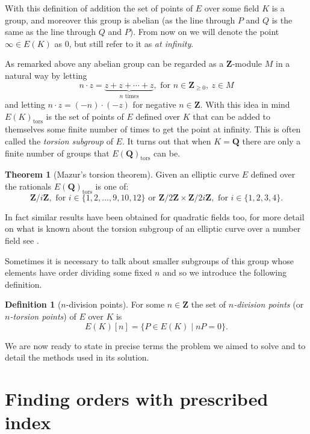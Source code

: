 \documentclass[12pt,a4paper,abstracton,bibtotoc]{scrreprt}
\theoremstyle{definition}
\newtheorem{thm}{Theorem}
\newtheorem{defn}{Definition}
\newcommand{\QQ}{\mathbf{Q}}
\newcommand{\ZZ}{\mathbf{Z}}
\begin{document}
With this definition of addition the set of points of $E$ over some field $K$ is a group, and moreover this group is abelian (as the line through $P$ and $Q$ is the same as the line through $Q$ and $P$).
From now on we will denote the point $\infty\in E(K)$ as $0$, but still refer to it as \emph{at infinity}.


As remarked above any abelian group can be regarded as a $\ZZ$-module $M$ in a natural way by letting 
\[n\cdot z = \underbrace{z + z + \cdots + z}_\text{$n$ times},\text{ for } n\in\ZZ_{\ge 0},\ z\in M\]
and letting $n\cdot z = (-n)\cdot(-z)$ for negative $n\in \ZZ$.
With this idea in mind $E(K)_\text{tors}$ is the set of points of $E$ defined over $K$ that can be added to themselves some finite number of times to get the point at infinity.
This is often called the \emph{torsion subgroup} of $E$.
It turns out that when $K = \QQ$ there are only a finite number of groups that $E(\QQ)_\text{tors}$ can be.

\begin{thm}[Mazur's torsion theorem]
\label{thm:tors}
Given an elliptic curve $E$ defined over the rationals $E(\QQ)_\text{tors}$ is one of:
\[
\ZZ/i\ZZ,\text{ for } i \in\{1,2,\ldots,9,10,12\}\text{ or }
\ZZ/2\ZZ \times \ZZ/2i\ZZ,\text{ for } i \in\{1,2,3,4\}.
\]
\end{thm}

In fact similar results have been obtained for quadratic fields too, for more detail on what is known about the torsion subgroup of an elliptic curve over a number field see \cite{sutherland}.

Sometimes it is necessary to talk about smaller subgroups of this group whose elements have order dividing some fixed $n$ and so we introduce the following definition.
\begin{defn}[$n$-division points]
For some $n\in\ZZ$ the set of \emph{$n$-division points} (or \emph{$n$-torsion points}) of $E$ over $K$ is
\[
E(K)[n] = \{P\in E(K) \mid nP = 0\}.
\]
\end{defn}

\minisec{}
We are now ready to state in precise terms the problem we aimed to solve and to detail the methods used in its solution.


\chapter{Finding orders with prescribed index}
\label{chap:prob}
\end{document}
